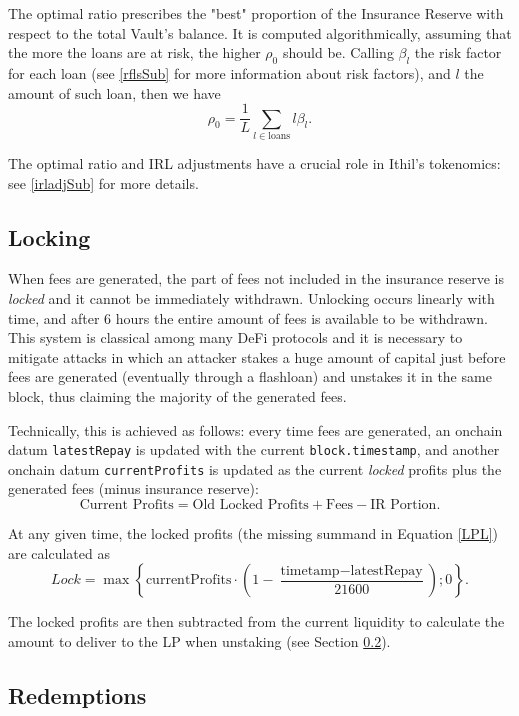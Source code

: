 \documentclass[a4paper,10 pt]{article}
\theoremstyle{definition}
\begin{document}
The optimal ratio prescribes the "best" proportion of the Insurance Reserve with respect to the total Vault's balance. It is computed algorithmically, assuming that the more the loans are at risk, the higher $\rho_0$ should be. Calling $\beta_l$ the risk factor for each loan (see \ref{rflsSub} for more information about risk factors), and $l$ the amount of such loan, then we have
\begin{equation}\label{optimalratio}
\rho_0 = \frac{1}{L}\sum_{l \in \text{loans}}l \beta_l.
\end{equation}

The optimal ratio and IRL adjustments have a crucial role in Ithil's tokenomics: see \ref{irladjSub} for more details.

\subsection{Locking}\label{lockSub}

When fees are generated, the part of fees not included in the insurance reserve is {\it locked} and it cannot be immediately withdrawn. Unlocking occurs linearly with time, and after 6 hours the entire amount of fees is available to be withdrawn. This system is classical among many DeFi protocols and it is necessary to mitigate attacks in which an attacker stakes a huge amount of capital just before fees are generated (eventually through a flashloan) and unstakes it in the same block, thus claiming the majority of the generated fees.

Technically, this is achieved as follows: every time fees are generated, an onchain datum \verb|latestRepay| is updated with the current \verb|block.timestamp|, and another onchain datum \verb|currentProfits| is updated as the current {\it locked} profits plus the generated fees (minus insurance reserve):
$$\text{Current Profits} = \text{Old Locked Profits} + \text{Fees} - \text{IR Portion}.$$

At any given time, the locked profits (the missing summand in Equation \eqref{LPL}) are calculated as 
$$Lock = \max\left\{\text{currentProfits}\cdot\left(1 - \frac{\text{timetamp} - \text{latestRepay}}{21600}\right); 0 \right\}.$$

The locked profits are then subtracted from the current liquidity to calculate the amount to deliver to the LP when unstaking (see Section \ref{redSub}).

\subsection{Redemptions}\label{redSub}
\end{document}
